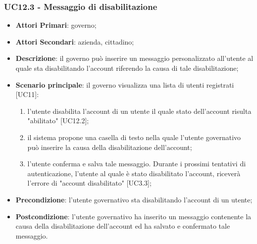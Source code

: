 \subsubsection{UC12.3 - Messaggio di disabilitazione}
\begin{itemize}
	\item \textbf{Attori Primari}:
	governo;
	\item \textbf{Attori Secondari}:
	azienda, cittadino;
	\item \textbf{Descrizione}: il governo può inserire un messaggio personalizzato all'utente al quale sta disabilitando l'account riferendo la causa di tale disabilitazione;
	\item \textbf{Scenario principale}: il governo visualizza una lista di utenti registrati [UC11]:
	\begin{enumerate}[label=\alph*.]
		\item l'utente disabilita l'account di un utente il quale stato dell'account risulta "abilitato" [UC12.2];
		\item il sistema propone una casella di testo nella quale l'utente governativo può inserire la causa della disabilitazione dell'account;
		\item l'utente conferma e salva tale messaggio. Durante i prossimi tentativi di autenticazione, l'utente al quale è stato disabilitato l'account, riceverà l'errore di "account disabilitato" [UC3.3];
	\end{enumerate}
	 
	\item \textbf{Precondizione}: l'utente governativo sta disabilitando l'account di un utente;
	\item \textbf{Postcondizione}: l'utente governativo ha inserito un messaggio contenente la causa della disabilitazione dell'account ed ha salvato e confermato tale messaggio.
\end{itemize}


